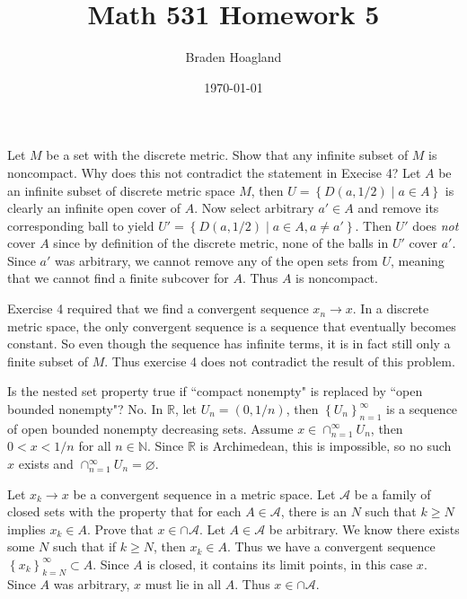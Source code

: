 \documentclass[10pt]{amsart}
\theoremstyle{plain}
\newenvironment{exercise}[1]{%
  \renewcommand\themanualtheoreminner{#1}%
  \manualtheoreminner
}{\endmanualtheoreminner}
\theoremstyle{definition}
\begin{document}
%

\title{Math 531 Homework 5}
\author{Braden Hoagland}


\date{\today}

\maketitle

\begin{exercise}{3.1.5}
	Let $M$ be a set with the discrete metric. Show that any infinite subset of $M$ is noncompact. Why does this not contradict the statement in Execise 4?
	\hrulefill
\end{exercise}
Let $A$ be an infinite subset of discrete metric space $M$, then $U = \left\{ D(a, 1/2) \;|\; a \in A \right\}$ is clearly an infinite open cover of $A$. Now select arbitrary $a' \in A$ and remove its corresponding ball to yield $U' = \left\{ D(a,1/2) \;|\; a \in A, a \neq a' \right\}$. Then $U'$ does \textit{not} cover $A$ since by definition of the discrete metric, none of the balls in $U'$ cover $a'$. Since $a'$ was arbitrary, we cannot remove any of the open sets from $U$, meaning that we cannot find a finite subcover for $A$. Thus $A$ is noncompact.

Exercise 4 required that we find a convergent sequence $x_n \to x$. In a discrete metric space, the only convergent sequence is a sequence that eventually becomes constant. So even though the sequence has infinite terms, it is in fact still only a finite subset of $M$. Thus exercise 4 does not contradict the result of this problem.

\begin{exercise}{3.3.2}
	Is the nested set property true if ``compact nonempty" is replaced by ``open bounded nonempty"?
	\hrulefill
\end{exercise}
No. In $\mathbb{R}$, let $U_n = (0,1/n)$, then $\left\{ U_n \right\}_{n=1}^\infty$ is a sequence of open bounded nonempty decreasing sets. Assume $x \in \cap_{n=1}^\infty U_n$, then $0 < x < 1/n$ for all $n \in \mathbb{N}$. Since $\mathbb{R}$ is Archimedean, this is impossible, so no such $x$ exists and $\cap_{n=1}^\infty U_n = \varnothing$.

\begin{exercise}{3.3.4}
	Let $x_k \to x$ be a convergent sequence in a metric space. Let $\mathcal{A}$ be a family of closed sets with the property that for each $A \in \mathcal{A}$, there is an $N$ such that $k \geq N$ implies $x_k \in A$. Prove that $x \in \cap \mathcal{A}$.
	\hrulefill
\end{exercise}
Let $A \in \mathcal{A}$ be arbitrary. We know there exists some $N$ such that if $k \geq N$, then $x_k \in A$. Thus we have a convergent sequence $\left\{ x_k \right\}_{k=N}^\infty \subset A$. Since $A$ is closed, it contains its limit points, in this case $x$. Since $A$ was arbitrary, $x$ must lie in all $A$. Thus $x \in \cap \mathcal{A}$.
\end{document}
